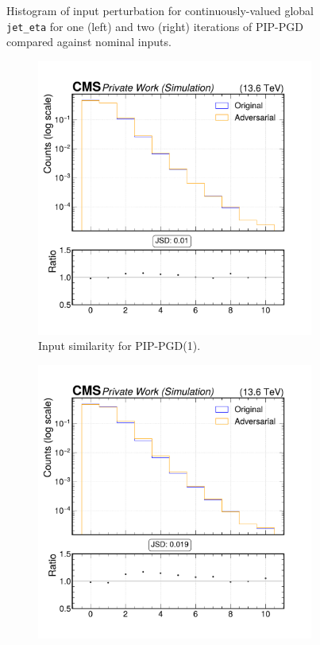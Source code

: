 \begin{figure}[htbp]
  \caption{Histogram of input perturbation for continuously-valued global \texttt{jet\_eta} for one (left) and two (right) iterations of PIP-PGD compared against nominal inputs.}
  \label{fig:combined_input_eta}
\end{figure}

\begin{figure}[htbp]
  \centering
  \begin{subfigure}[t]{0.5\textwidth}
    \includegraphics[width=\linewidth]{media/output/features/compare/combined_it_1/cmp_global_features_nsv.pdf}
    \caption{Input similarity for PIP-PGD(1).}
    \label{fig:left}
  \end{subfigure}\hfill
  \begin{subfigure}[t]{0.5\textwidth}
    \includegraphics[width=\linewidth]{media/output/features/compare/combined_it_2/cmp_global_features_nsv.pdf}

\end{subfigure}
\end{figure}
